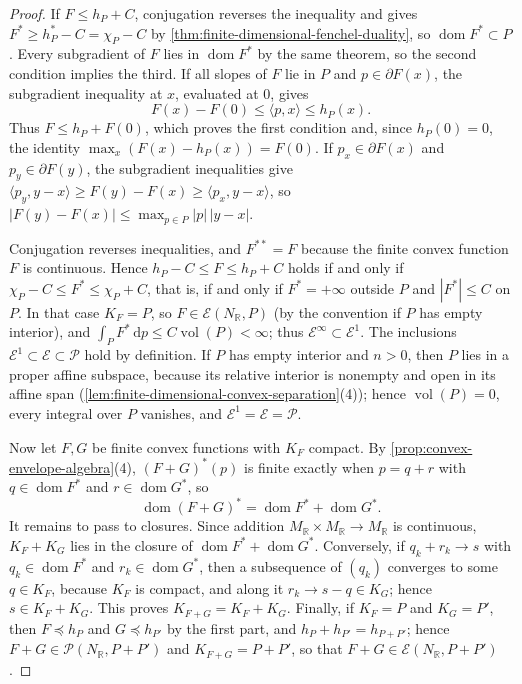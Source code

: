 \begin{proof}
If $F\leq h_P+C$, conjugation reverses the inequality and gives $F^*\geq h_P^*-C=\chi_P-C$ by \cref{thm:finite-dimensional-fenchel-duality}, so $\operatorname{dom}F^*\subset P$. Every subgradient of $F$ lies in $\operatorname{dom}F^*$ by the same theorem, so the second condition implies the third. If all slopes of $F$ lie in $P$ and $p\in\partial F(x)$, the subgradient inequality at $x$, evaluated at $0$, gives
\[
 F(x)-F(0)\leq\langle p,x\rangle\leq h_P(x).
\]
Thus $F\leq h_P+F(0)$, which proves the first condition and, since $h_P(0)=0$, the identity $\max_x(F(x)-h_P(x))=F(0)$. If $p_x\in\partial F(x)$ and $p_y\in\partial F(y)$, the subgradient inequalities give $\langle p_y,y-x\rangle\geq F(y)-F(x)\geq\langle p_x,y-x\rangle$, so $|F(y)-F(x)|\leq\max_{p\in P}|p|\,|y-x|$.

Conjugation reverses inequalities, and $F^{**}=F$ because the finite convex function $F$ is continuous. Hence $h_P-C\leq F\leq h_P+C$ holds if and only if $\chi_P-C\leq F^*\leq\chi_P+C$, that is, if and only if $F^*=+\infty$ outside $P$ and $|F^*|\leq C$ on $P$. In that case $K_F=P$, so $F\in\mathcal E(N_{\mathbb R},P)$ (by the convention if $P$ has empty interior), and $\int_PF^*\,\mathrm dp\leq C\operatorname{vol}(P)<\infty$; thus $\mathcal E^\infty\subset\mathcal E^1$. The inclusions $\mathcal E^1\subset\mathcal E\subset\mathcal P$ hold by definition. If $P$ has empty interior and $n>0$, then $P$ lies in a proper affine subspace, because its relative interior is nonempty and open in its affine span (\cref{lem:finite-dimensional-convex-separation}(4)); hence $\operatorname{vol}(P)=0$, every integral over $P$ vanishes, and $\mathcal E^1=\mathcal E=\mathcal P$.

Now let $F,G$ be finite convex functions with $K_F$ compact. By \cref{prop:convex-envelope-algebra}(4), $(F+G)^*(p)$ is finite exactly when $p=q+r$ with $q\in\operatorname{dom}F^*$ and $r\in\operatorname{dom}G^*$, so
\[
 \operatorname{dom}(F+G)^*=\operatorname{dom}F^*+\operatorname{dom}G^*.
\]
It remains to pass to closures. Since addition $M_{\mathbb R}\times M_{\mathbb R}\to M_{\mathbb R}$ is continuous, $K_F+K_G$ lies in the closure of $\operatorname{dom}F^*+\operatorname{dom}G^*$. Conversely, if $q_k+r_k\to s$ with $q_k\in\operatorname{dom}F^*$ and $r_k\in\operatorname{dom}G^*$, then a subsequence of $(q_k)$ converges to some $q\in K_F$, because $K_F$ is compact, and along it $r_k\to s-q\in K_G$; hence $s\in K_F+K_G$. This proves $K_{F+G}=K_F+K_G$. Finally, if $K_F=P$ and $K_G=P'$, then $F\preceq h_P$ and $G\preceq h_{P'}$ by the first part, and $h_P+h_{P'}=h_{P+P'}$; hence $F+G\in\mathcal P(N_{\mathbb R},P+P')$ and $K_{F+G}=P+P'$, so that $F+G\in\mathcal E(N_{\mathbb R},P+P')$.
\end{proof}


